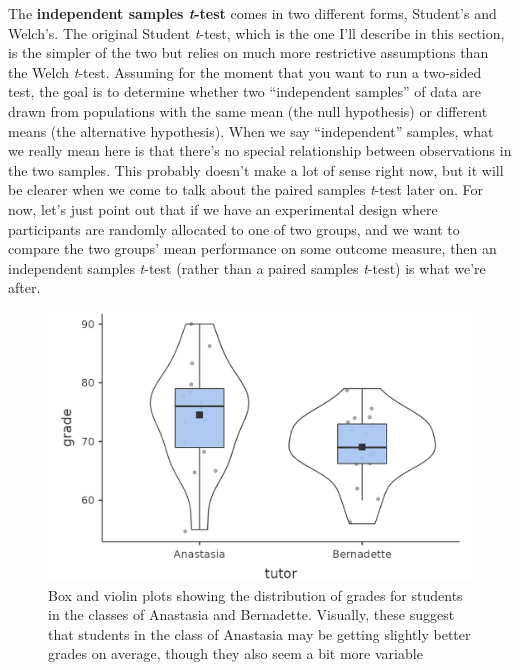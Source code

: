 \documentclass[
  a4paper,
]{book}
\begin{document}
The \textbf{independent samples \emph{t}-test} comes in two different
forms, Student's and Welch's. The original Student \emph{t}-test, which
is the one I'll describe in this section, is the simpler of the two but
relies on much more restrictive assumptions than the Welch
\emph{t}-test. Assuming for the moment that you want to run a two-sided
test, the goal is to determine whether two ``independent samples'' of
data are drawn from populations with the same mean (the null hypothesis)
or different means (the alternative hypothesis). When we say
``independent'' samples, what we really mean here is that there's no
special relationship between observations in the two samples. This
probably doesn't make a lot of sense right now, but it will be clearer
when we come to talk about the paired samples \emph{t}-test later on.
For now, let's just point out that if we have an experimental design
where participants are randomly allocated to one of two groups, and we
want to compare the two groups' mean performance on some outcome
measure, then an independent samples \emph{t}-test (rather than a paired
samples \emph{t}-test) is what we're after.

\begin{figure}

\includegraphics[width=1\textwidth,height=\textheight]{images/fig11-7.png} \hfill{}

\caption{\label{fig-fig11-7}Box and violin plots showing the
distribution of grades for students in the classes of Anastasia and
Bernadette. Visually, these suggest that students in the class of
Anastasia may be getting slightly better grades on average, though they
also seem a bit more variable}

\end{figure}
\end{document}
